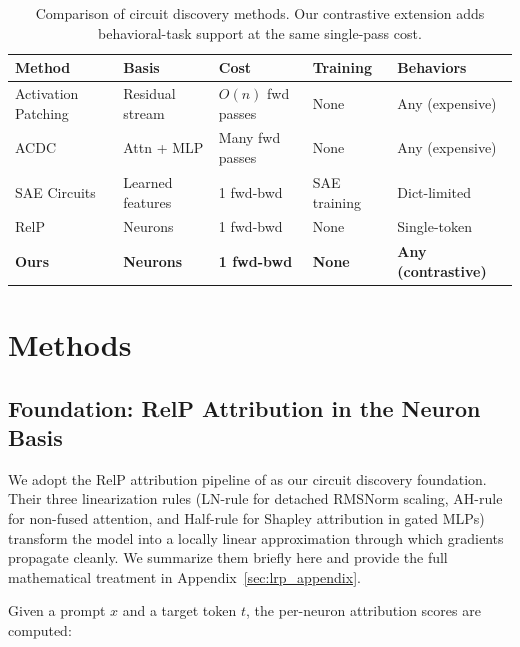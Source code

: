 \documentclass[11pt]{article}
\begin{document}
\begin{table}[t]
\centering
\caption{Comparison of circuit discovery methods. Our contrastive extension adds behavioral-task support at the same single-pass cost.}
\label{tab:landscape}
\small
\begin{tabular}{lllll}
\toprule
\textbf{Method} & \textbf{Basis} & \textbf{Cost} & \textbf{Training} & \textbf{Behaviors} \\
\midrule
Activation Patching & Residual stream & $O(n)$ fwd passes & None & Any (expensive) \\
ACDC~\citep{conmy2023acdc} & Attn + MLP & Many fwd passes & None & Any (expensive) \\
SAE Circuits~\citep{marks2024sparse} & Learned features & 1 fwd-bwd & SAE training & Dict-limited \\
RelP~\citep{arora2025circuits} & Neurons & 1 fwd-bwd & None & Single-token \\
\textbf{Ours} & \textbf{Neurons} & \textbf{1 fwd-bwd} & \textbf{None} & \textbf{Any (contrastive)} \\
\bottomrule
\end{tabular}
\end{table}


\section{Methods}
\label{sec:method}

\subsection{Foundation: RelP Attribution in the Neuron Basis}
\label{sec:foundation}

We adopt the RelP attribution pipeline of \citet{arora2025circuits} as our circuit discovery foundation.
Their three linearization rules (LN-rule for detached RMSNorm scaling, AH-rule for non-fused attention, and Half-rule for Shapley attribution in gated MLPs) transform the model into a locally linear approximation through which gradients propagate cleanly.
We summarize them briefly here and provide the full mathematical treatment in Appendix~\ref{sec:lrp_appendix}.

Given a prompt $x$ and a target token $t$, the per-neuron attribution scores are computed:
\end{document}
